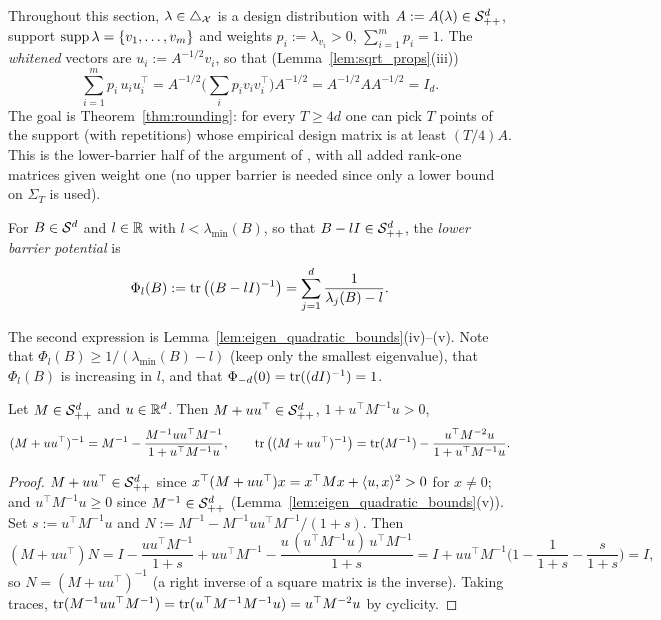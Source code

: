 Throughout this section, $\lambda \in \triangle_{\mathcal{X}}$ is a design distribution with
$A := A(\lambda) \in \mathcal{S}_{++}^{d}$, support $\operatorname{supp}\lambda = \{v_1,\dots,v_m\}$ and weights
$p_i := \lambda_{v_i} > 0$, $\sum_{i=1}^m p_i = 1$. The \emph{whitened} vectors are
$u_i := A^{-1/2}v_i$, so that (Lemma~\ref{lem:sqrt_props}(iii))
\[
  \sum_{i=1}^m p_i\,u_iu_i^\top = A^{-1/2}\Big(\sum_i p_iv_iv_i^\top\Big)A^{-1/2} = A^{-1/2}AA^{-1/2} = I_d .
\]
The goal is Theorem~\ref{thm:rounding}: for every $T \ge 4d$ one can pick $T$ points of the
support (with repetitions) whose empirical design matrix is at least $(T/4)A$. This is the
lower-barrier half of the argument of \cite{batson2012twice}, with all added rank-one
matrices given weight one (no upper barrier is needed since only a lower bound on
$\Sigma_T$ is used).

\begin{definition}\label{def:barrier_potential}
\leanok
{}
For $B \in \mathcal{S}^{d}$ and $l \in \mathbb{R}$ with $l < \lambda_{\min}(B)$, so that $B - lI \in \mathcal{S}_{++}^{d}$, the
\emph{lower barrier potential} is
\[
  \Phi_l(B) := \operatorname{tr}\big((B - lI)^{-1}\big) = \sum_{j=1}^d \frac{1}{\lambda_j(B) - l} .
\]
\end{definition}

The second expression is Lemma~\ref{lem:eigen_quadratic_bounds}(iv)--(v). Note that
$\Phi_l(B) \ge 1/(\lambda_{\min}(B) - l)$ (keep only the smallest eigenvalue), that $\Phi_l(B)$ is
increasing in $l$, and that $\Phi_{-d}(0) = \operatorname{tr}((dI)^{-1}) = 1$.

\begin{lemma}\label{lem:sherman_morrison_trace}
\leanok
{}
Let $M \in \mathcal{S}_{++}^{d}$ and $u \in \mathbb{R}^d$. Then $M + uu^\top \in \mathcal{S}_{++}^{d}$, $1 + u^\top M^{-1}u > 0$,
\[
  (M + uu^\top)^{-1} = M^{-1} - \frac{M^{-1}uu^\top M^{-1}}{1 + u^\top M^{-1}u},
  \qquad
  \operatorname{tr}\big((M + uu^\top)^{-1}\big) = \operatorname{tr}(M^{-1}) - \frac{u^\top M^{-2}u}{1 + u^\top M^{-1}u} .
\]
\end{lemma}

\begin{proof}
\leanok
{}
$M + uu^\top \in \mathcal{S}_{++}^{d}$ since $x^\top(M+uu^\top)x = x^\top Mx + \langle u, x \rangle^2 > 0$ for $x \ne 0$; and
$u^\top M^{-1}u \ge 0$ since $M^{-1} \in \mathcal{S}_{++}^{d}$ (Lemma~\ref{lem:eigen_quadratic_bounds}(v)). Set
$s := u^\top M^{-1}u$ and $N := M^{-1} - M^{-1}uu^\top M^{-1}/(1+s)$. Then
\[
  (M + uu^\top)N = I - \frac{uu^\top M^{-1}}{1+s} + uu^\top M^{-1} - \frac{u\,(u^\top M^{-1}u)\,u^\top M^{-1}}{1+s}
  = I + uu^\top M^{-1}\Big(1 - \frac{1}{1+s} - \frac{s}{1+s}\Big) = I ,
\]
so $N = (M+uu^\top)^{-1}$ (a right inverse of a square matrix is the inverse). Taking traces,
$\operatorname{tr}(M^{-1}uu^\top M^{-1}) = \operatorname{tr}(u^\top M^{-1}M^{-1}u) = u^\top M^{-2}u$ by cyclicity.
\end{proof}

